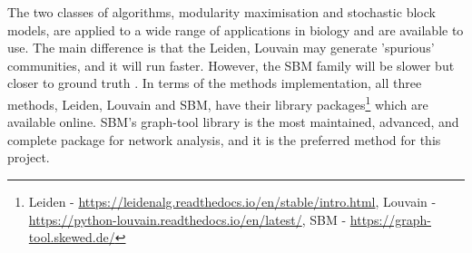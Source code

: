 The two classes of algorithms, modularity maximisation and stochastic block models, are applied to a wide range of applications in biology and are available to use. The main difference is that the Leiden, Louvain may generate 'spurious' communities, and it will run faster. However, the SBM family will be slower but closer to ground truth \citep{Peixoto2023-se}. In terms of the methods implementation, all three methods, Leiden, Louvain and SBM, have their library packages\footnote{Leiden - \url{https://leidenalg.readthedocs.io/en/stable/intro.html}, Louvain - \url{https://python-louvain.readthedocs.io/en/latest/}, SBM - \url{https://graph-tool.skewed.de/}} which are available online. SBM's graph-tool library is the most maintained, advanced, and complete package for network analysis, and it is the preferred method for this project.






